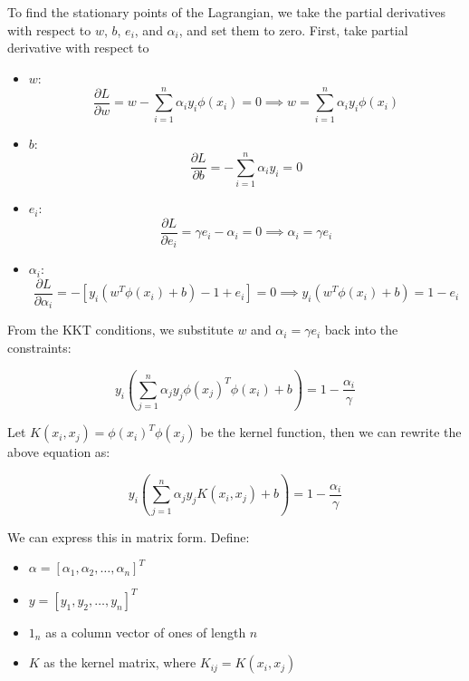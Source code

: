 To find the stationary points of the Lagrangian, we take the partial derivatives with respect to \( w \), \( b \), \( e_i \), and \( \alpha_i \), and set them to zero. First, take partial derivative with respect to 

\begin{itemize}
	\item \( w \): \[
   \frac{\partial L}{\partial w} = w - \sum_{i=1}^n \alpha_i y_i \phi(x_i) = 0 \implies w = \sum_{i=1}^n \alpha_i y_i \phi(x_i)
   \]
	\item \( b \):
   \[
   \frac{\partial L}{\partial b} = -\sum_{i=1}^n \alpha_i y_i = 0
   \]
\item \( e_i \):
   \[
   \frac{\partial L}{\partial e_i} = \gamma e_i - \alpha_i = 0 \implies \alpha_i = \gamma e_i
   \]
\item \( \alpha_i \):
   \[
   \frac{\partial L}{\partial \alpha_i} = - \left[ y_i (w^T \phi(x_i) + b) - 1 + e_i \right] = 0 \implies y_i (w^T \phi(x_i) + b) = 1 - e_i
   \]
\end{itemize}


From the KKT conditions, we substitute \( w \) and \( \alpha_i = \gamma e_i \) back into the constraints:

\[
y_i \left( \sum_{j=1}^n \alpha_j y_j \phi(x_j)^T \phi(x_i) + b \right) = 1 - \frac{\alpha_i}{\gamma}
\]

Let \( K(x_i, x_j) = \phi(x_i)^T \phi(x_j) \) be the kernel function, then we can rewrite the above equation as:

\[
y_i \left( \sum_{j=1}^n \alpha_j y_j K(x_i, x_j) + b \right) = 1 - \frac{\alpha_i}{\gamma}
\]

We can express this in matrix form. Define:
\begin{itemize}
	\item \( \alpha = [\alpha_1, \alpha_2, \ldots, \alpha_n]^T \)
	\item \( y = [y_1, y_2, \ldots, y_n]^T \)
	\item \( 1_n \) as a column vector of ones of length \( n \)
	\item \( K \) as the kernel matrix, where \( K_{ij} = K(x_i, x_j) \)
\end{itemize}


